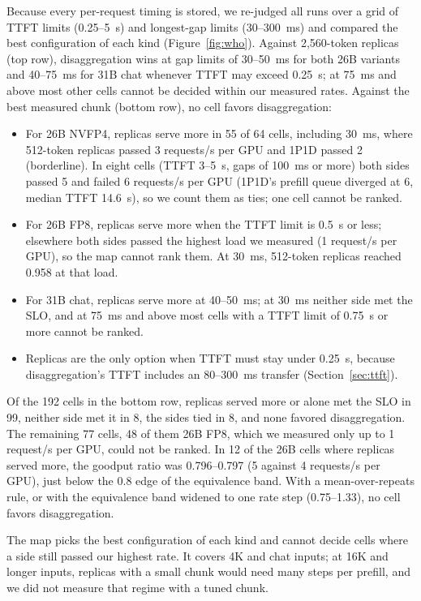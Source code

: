 \documentclass[11pt]{article}
\begin{document}
Because every per-request timing is stored, we re-judged all runs over a grid of TTFT limits (0.25--5~s) and longest-gap limits (30--300~ms) and compared the best configuration of each kind (Figure~\ref{fig:who}). Against 2,560-token replicas (top row), disaggregation wins at gap limits of 30--50~ms for both 26B variants and 40--75~ms for 31B chat whenever TTFT may exceed 0.25~s; at 75~ms and above most other cells cannot be decided within our measured rates. Against the best measured chunk (bottom row), no cell favors disaggregation:
\begin{itemize}
  \item For 26B NVFP4, replicas serve more in 55 of 64 cells, including 30~ms, where 512-token replicas passed 3 requests/s per GPU and 1P1D passed 2 (borderline). In eight cells (TTFT 3--5~s, gaps of 100~ms or more) both sides passed 5 and failed 6 requests/s per GPU (1P1D's prefill queue diverged at 6, median TTFT 14.6~s), so we count them as ties; one cell cannot be ranked.
  \item For 26B FP8, replicas serve more when the TTFT limit is 0.5~s or less; elsewhere both sides passed the highest load we measured (1 request/s per GPU), so the map cannot rank them. At 30~ms, 512-token replicas reached 0.958 at that load.
  \item For 31B chat, replicas serve more at 40--50~ms; at 30~ms neither side met the SLO, and at 75~ms and above most cells with a TTFT limit of 0.75~s or more cannot be ranked.
  \item Replicas are the only option when TTFT must stay under 0.25~s, because disaggregation's TTFT includes an 80--300~ms transfer (Section~\ref{sec:ttft}).
\end{itemize}
Of the 192 cells in the bottom row, replicas served more or alone met the SLO in 99, neither side met it in 8, the sides tied in 8, and none favored disaggregation. The remaining 77 cells, 48 of them 26B FP8, which we measured only up to 1 request/s per GPU, could not be ranked. In 12 of the 26B cells where replicas served more, the goodput ratio was 0.796--0.797 (5 against 4 requests/s per GPU), just below the 0.8 edge of the equivalence band. With a mean-over-repeats rule, or with the equivalence band widened to one rate step (0.75--1.33), no cell favors disaggregation.

The map picks the best configuration of each kind and cannot decide cells where a side still passed our highest rate. It covers 4K and chat inputs; at 16K and longer inputs, replicas with a small chunk would need many steps per prefill, and we did not measure that regime with a tuned chunk.
\end{document}
